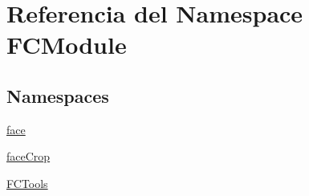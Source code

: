 \hypertarget{namespace_f_c_module}{}\section{Referencia del Namespace F\+C\+Module}
\label{namespace_f_c_module}
\subsection*{Namespaces}
\begin{DoxyCompactItemize}
\item 
 \mbox{\hyperlink{namespace_f_c_module_1_1face}{face}}
\item 
 \mbox{\hyperlink{namespace_f_c_module_1_1face_crop}{face\+Crop}}
\item 
 \mbox{\hyperlink{namespace_f_c_module_1_1_f_c_tools}{F\+C\+Tools}}
\end{DoxyCompactItemize}
